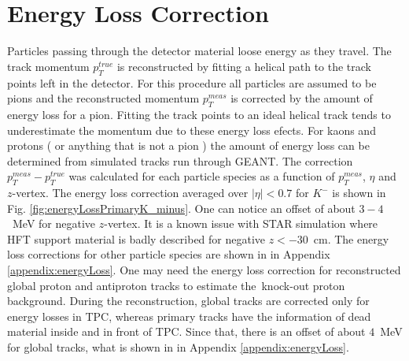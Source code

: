 

\chapter{Energy Loss Correction}\label{chap:energyLossCorrection}
Particles passing through the detector material loose energy as they travel. The track momentum $p_T^{true}$ is reconstructed by fitting a helical path to the track points left in the detector. For this procedure all particles are assumed to be pions and the reconstructed momentum $p_T^{meas}$ is corrected by the amount of energy loss for a pion. Fitting the track points to an ideal
helical track tends to underestimate the momentum due to these energy loss efects. For kaons and protons ( or anything that is not a pion ) the amount of energy loss can be determined from simulated tracks run through GEANT.
The correction $p_T^{meas}-p_T^{true}$ was calculated for each particle species as a function of $p_T^{meas}$, $\eta$ and $z$-vertex. The energy loss correction averaged over $|\eta|<0.7$ for $K^-$ is shown in Fig. \ref{fig:energyLossPrimaryK_minus}. One can notice an offset of about $3-4$~MeV for negative $z$-vertex. It is a known issue with STAR simulation where HFT support material is badly described for negative $z<-30$~cm.
\noindent The energy loss corrections for other particle species are shown in  in Appendix \ref{appendix:energyLoss}.\newline
\noindent One may need the energy loss correction for reconstructed global proton and antiproton tracks to estimate the~knock-out proton background. During the reconstruction, global tracks are corrected only for energy losses in TPC, whereas primary tracks have the information of dead material inside and in front of TPC. Since that, there is an offset of about $4$~MeV for global tracks, what is shown in  in Appendix \ref{appendix:energyLoss}.


